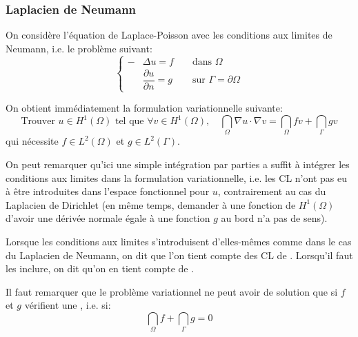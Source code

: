 \medskip
\subsubsection{Laplacien de Neumann}
On considère l'équation de Laplace-Poisson avec les conditions aux limites de Neumann,
i.e. le problème suivant:
\begin{equation}\left\{\begin{aligned}
-&\Delta u=f &&\text{ dans } \Omega\\
&\dfrac{\partial u}{\partial n}=g &&\text{ sur } \Gamma=\partial\Omega
\end{aligned}
\right.
\end{equation}

\medskip
On obtient immédiatement la formulation variationnelle suivante:
\begin{equation}
\text{Trouver }u\in H^1(\Omega)  \text{ tel que }
\forall v\in H^1(\Omega),\quad \dint_\Omega \nabla u\cdot\nabla v  =  \dint_\Omega fv + \dint_\Gamma gv
\end{equation}
qui nécessite $f\in L^2(\Omega)$ et $g\in L^2(\Gamma)$.

\medskip
On peut remarquer qu'ici une simple intégration par parties a suffit à intégrer les conditions aux
limites dans la formulation variationnelle, i.e. les CL n'ont pas eu à être introduites
dans l'espace fonctionnel pour $u$, contrairement au cas du Laplacien de Dirichlet
(en même temps, demander à une fonction de $H^1(\Omega)$ d'avoir une dérivée
normale égale à une fonction $g$ au bord n'a pas de sens).

Lorsque les conditions aux limites s'introduisent d'elles-mêmes comme dans
le cas du Laplacien de Neumann, on dit que l'on tient compte des CL de
. Lorsqu'il faut les inclure, on dit qu'on en tient
compte de .

\medskip
Il faut remarquer que le problème variationnel ne peut avoir de solution que
si $f$ et $g$ vérifient une , i.e. si:
\begin{equation}
\dint_\Omega f + \dint_\Gamma g = 0
\end{equation}

